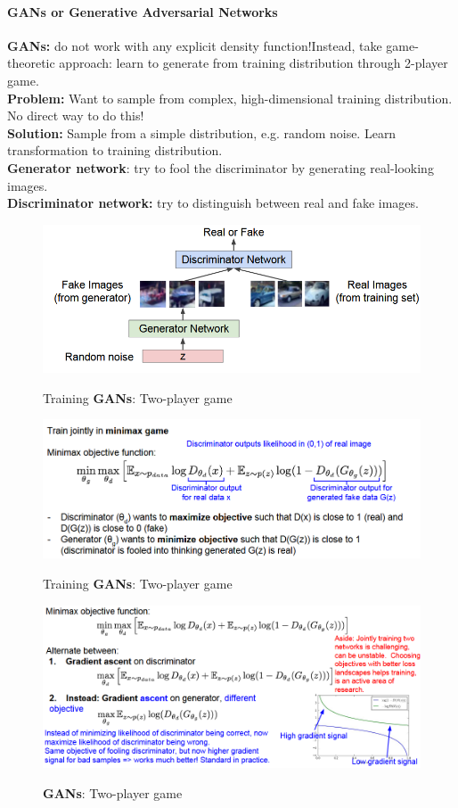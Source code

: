 \documentclass[11pt]{article}
\begin{document}
\paragraph{GANs or Generative Adversarial Networks}
\textbf{GANs:} do not work with any explicit density function!Instead, take game-theoretic approach: learn to generate from training distribution through 2-player game.\\
\textbf{Problem:} Want to sample from complex, high-dimensional training distribution.  No direct way to do this!
\\
\textbf{Solution:} Sample from a simple distribution, e.g. random noise.  Learn transformation to training distribution.\\
\textbf{Generator network}: try to fool the discriminator by generating real-looking images.\\
\textbf{Discriminator network: }try to distinguish between real and fake images.
\begin{figure}[h]
\centering
\captionsetup{justification=centering}
\includegraphics[width=0.6\linewidth]{L1223.pdf}
\label{fig:L1223}
\caption{Training \textbf{GANs}: Two-player game}
\end{figure}
\begin{figure}[h]
\centering
\captionsetup{justification=centering}
\includegraphics[width=0.7\linewidth]{L1224.pdf}
\label{fig:L1224}
\caption{Training \textbf{GANs}: Two-player game}
\end{figure}
\begin{figure}[h]
\centering
\captionsetup{justification=centering}
\includegraphics[width=0.7\linewidth]{L1225.pdf}
\label{fig:L1225}
\caption{ \textbf{GANs}: Two-player game}
\end{figure}
\clearpage
\end{document}
